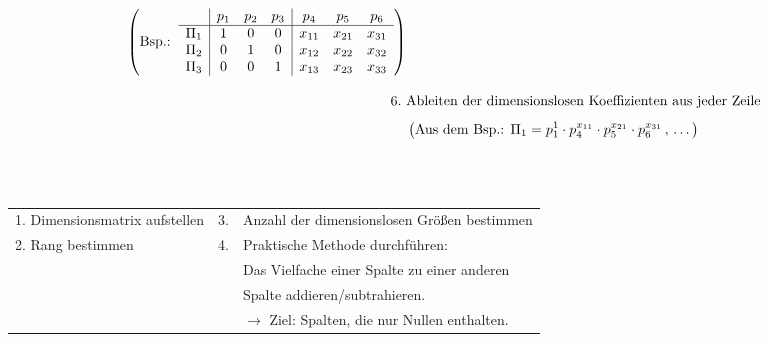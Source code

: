 \begin{align*}
\begin{array}{c|c c c|c c c}
        \end{array}
        \hspace{6mm}
        \left(
        \text{Bsp.:} \hspace{2mm}
        \begin{array}{c|c c c|c c c}
                  & p_1 & p_2 & p_3 & p_4    & p_5    & p_6    \\ \hline
            \Pi_1 & 1   & 0   & 0   & x_{11} & x_{21} & x_{31} \\
            \Pi_2 & 0   & 1   & 0   & x_{12} & x_{22} & x_{32} \\
            \Pi_3 & 0   & 0   & 1   & x_{13} & x_{23} & x_{33} 
        \end{array}\right)\\[2.0ex]
    6.~&\text{Ableiten der dimensionslosen Koeffizienten aus jeder Zeile}\\[1.0ex]
       &\left(\text{Aus dem Bsp.: } \Pi_1 = p_1^1\cdot p_4^{x_{11}} \cdot p_5^{x_{21}} \cdot p_6^{x_{31}}\,,\,\dots\right)
\end{align*}
\vspace{5mm}

 \\ \vspace{2mm}
 \\ \vspace{3mm}
\begin{tabular}{l l l}
    1. Dimensionsmatrix aufstellen \qquad & 3. & \hspace{-4mm} Anzahl der dimensionslosen Größen bestimmen \\[1.0ex]
    2. Rang bestimmen                     & 4. & \hspace{-4mm} Praktische Methode durchführen:             \\[1.0ex]
                                          &    & \hspace{-4mm} Das Vielfache einer Spalte zu einer anderen \\
                                          &    & \hspace{-4mm} Spalte addieren/subtrahieren.               \\
                                          &    & \hspace{-4mm} $\rightarrow$ Ziel: Spalten, die nur Nullen enthalten.
\end{tabular}
\vspace{5mm}

